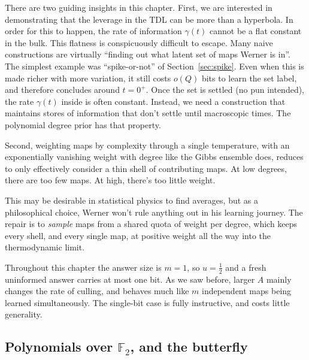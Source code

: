 \documentclass[11pt]{article}
\begin{document}
There are two guiding insights in this chapter.
First, we are interested in demonstrating that the leverage in the TDL can be more than
a hyperbola. In order for this to happen, the rate of information $\gamma(t)$ cannot be a
flat constant in the bulk. This flatness is conspicuously difficult to escape. Many naive
constructions are virtually ``finding out what latent set of maps Werner is in''. The simplest
example was ``spike-or-not'' of Section~\ref{sec:spike}. 
Even when this is made richer with more variation, it still costs
 $o(Q)$ bits to learn the set label, and therefore concludes around $t=0^+$. Once the set is
 settled (no pun intended), the rate $\gamma(t)$ inside is often constant. Instead, we
 need a construction that maintains stores of information that don't settle until macroscopic times.
 The polynomial degree prior has that property.

 Second, weighting maps by
complexity through a single temperature, with an exponentially vanishing weight with degree like the Gibbs ensemble does, reduces 
to only effectively consider a thin shell of contributing maps. At low degrees, there are too few maps. At high, there's too little weight.

This may be desirable
in statistical physics to find averages, but as a philosophical choice, Werner won't rule anything out
in his learning journey. The repair
is to \emph{sample} maps from a shared quota of weight per degree, which
keeps every shell, and every single map, at positive weight all
the way into the thermodynamic limit. 

Throughout this chapter the
answer size is $m = 1$, so $u = \tfrac12$ and a fresh uninformed answer
carries at most one bit. As we saw before, larger $A$ mainly changes the rate of
culling, and behaves much like $m$ independent maps being learned simultaneously. 
The single-bit case is fully instructive, and costs little generality.

\subsection{Polynomials over
\texorpdfstring{$\mathbb F_2$}{F2}, and the butterfly}
\end{document}
